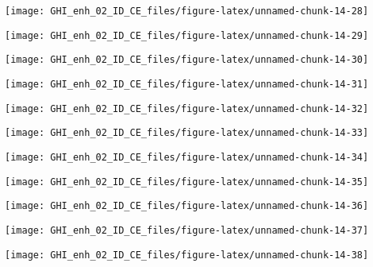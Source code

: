 \documentclass[
  10pt,
  a4paper,oneside]{article}
\begin{document}
\begin{center}\texttt{[image: GHI\_enh\_02\_ID\_CE\_files/figure-latex/unnamed-chunk-14-28]} \end{center}

\begin{center}\texttt{[image: GHI\_enh\_02\_ID\_CE\_files/figure-latex/unnamed-chunk-14-29]} \end{center}

\begin{center}\texttt{[image: GHI\_enh\_02\_ID\_CE\_files/figure-latex/unnamed-chunk-14-30]} \end{center}

\begin{center}\texttt{[image: GHI\_enh\_02\_ID\_CE\_files/figure-latex/unnamed-chunk-14-31]} \end{center}

\begin{center}\texttt{[image: GHI\_enh\_02\_ID\_CE\_files/figure-latex/unnamed-chunk-14-32]} \end{center}

\begin{center}\texttt{[image: GHI\_enh\_02\_ID\_CE\_files/figure-latex/unnamed-chunk-14-33]} \end{center}

\begin{center}\texttt{[image: GHI\_enh\_02\_ID\_CE\_files/figure-latex/unnamed-chunk-14-34]} \end{center}

\begin{center}\texttt{[image: GHI\_enh\_02\_ID\_CE\_files/figure-latex/unnamed-chunk-14-35]} \end{center}

\begin{center}\texttt{[image: GHI\_enh\_02\_ID\_CE\_files/figure-latex/unnamed-chunk-14-36]} \end{center}

\begin{center}\texttt{[image: GHI\_enh\_02\_ID\_CE\_files/figure-latex/unnamed-chunk-14-37]} \end{center}

\begin{center}\texttt{[image: GHI\_enh\_02\_ID\_CE\_files/figure-latex/unnamed-chunk-14-38]} \end{center}
\end{document}
